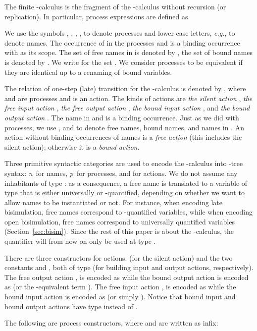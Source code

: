 \documentclass{acmtrans2m}
\newcommand{\name}{\hbox{\sl n}}
\newcommand{\proc}{\hbox{\sl p}}
\begin{document}
The finite -calculus is the fragment of the -calculus
without recursion (or replication). 
In particular, process expressions are defined as

We use the symbols , , , ,  to
denote processes and  lower case letters, {\em e.g.}, 
to denote names.
The occurrence of  in the processes  and  is a binding 
occurrence with  as its scope. 
The set of free names in  is denoted by , the set of bound
names is denoted by . We write  for the set
. We consider processes to be equivalent 
if they are identical up to a renaming of bound variables.


The relation of one-step (late) transition \cite{milner92icII} for the
-calculus is denoted by , 
where  and  are processes and  is an action. 
The kinds of actions are {\em the silent action} , 
{\em the free  input action} , 
{\em the free output action} , 
{\em the bound input action} , and
{\em the bound output action} . The name  in  and
 is a binding occurrence. Just as we did with processes, we use
,  and  to denote free names,
bound names, and names in . An action without binding
occurrences of names is a {\em free action} (this includes the silent action); 
otherwise it is a {\em bound action}. 

Three primitive syntactic categories are used to encode the
-calculus into -tree syntax: \name\ for names, \proc\
for processes, and  for actions.  We do not assume any
inhabitants of type : as a consequence, a free name is
translated to a variable of type  that is either universally or
-quantified, depending on whether we want to allow names to
be instantiated or not. For instance, when encoding late bisimulation,
free names correspond to -quantified variables, while when
encoding open bisimulation, free names correspond to universally
quantified variables (Section~\ref{sec:bisim}).  Since the rest of
this paper is about the -calculus, the  quantifier will
from now on only be used at type .

There are three constructors for actions:  (for the
silent action) and the two constants  and , both of
type  (for building input and output
actions, respectively).  The free output action , is encoded
as  while the bound output action  is encoded
as  (or the -equivalent term ).  The free input action , is encoded as  while
the bound input action  is encoded as 
(or simply ).  Notice that bound input and bound output actions
have type  instead of .

The following are process constructors, where  and  are written
as infix: 
\end{document}

